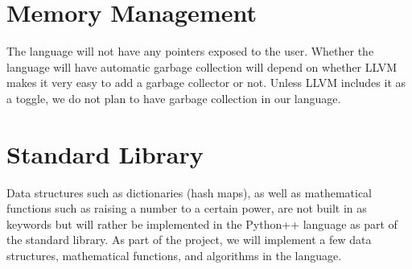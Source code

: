 \documentclass{article}
\begin{document}
\section{Memory Management}
The language will not have any pointers exposed to the user. Whether the language will have automatic garbage collection will depend on whether LLVM makes it very easy to add a garbage collector or not. Unless LLVM includes it as a toggle, we do not plan to have garbage collection in our language.

\section{Standard Library}
\label{sec:stl}
Data structures such as dictionaries (hash maps), as well as mathematical functions such as raising a number to a certain power, are not built in as keywords but will rather be implemented in the Python++ language as part of the standard library. As part of the project, we will implement a few data structures, mathematical functions, and algorithms in the language.
\end{document}
